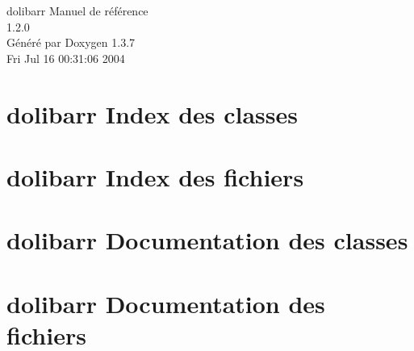 \documentclass[a4paper]{book}
\begin{document}
\begin{titlepage}
\vspace*{7cm}
\begin{center}
{\Large dolibarr Manuel de r\'{e}f\'{e}rence\\[1ex]\large 1.2.0 }\\
\vspace*{1cm}
{\large G\'{e}n\'{e}r\'{e} par Doxygen 1.3.7}\\
\vspace*{0.5cm}
{\small Fri Jul 16 00:31:06 2004}\\
\end{center}
\end{titlepage}
\clearemptydoublepage
{}
\tableofcontents
\clearemptydoublepage
{}
\chapter{dolibarr Index des classes}

\chapter{dolibarr Index des fichiers}

\chapter{dolibarr Documentation des classes}



\chapter{dolibarr Documentation des fichiers}







\printindex
\end{document}
